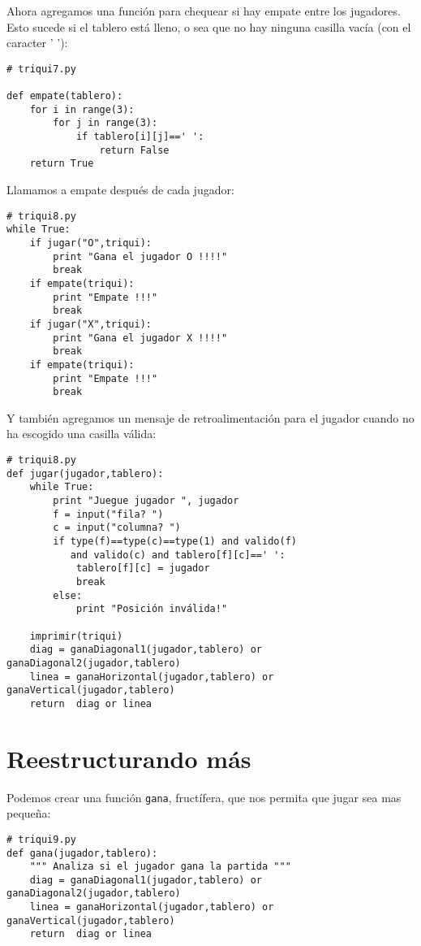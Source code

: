 Ahora agregamos una función para chequear si hay empate entre los jugadores.
Esto sucede si el tablero está lleno, o sea que no hay ninguna casilla vacía 
(con el caracter ' '):

\beforeverb
\begin{verbatim}
# triqui7.py

def empate(tablero):
    for i in range(3):
        for j in range(3):
            if tablero[i][j]==' ':
                return False
    return True

\end{verbatim}
\afterverb

Llamamos a empate después de cada jugador:
\beforeverb
\begin{verbatim}
# triqui8.py
while True:
    if jugar("O",triqui):
        print "Gana el jugador O !!!!"
        break
    if empate(triqui):
        print "Empate !!!"
        break
    if jugar("X",triqui):
        print "Gana el jugador X !!!!"
        break
    if empate(triqui):
        print "Empate !!!"
        break
\end{verbatim}
\afterverb

Y también agregamos un mensaje de retroalimentación para el jugador cuando no 
ha escogido una casilla válida:

\beforeverb
\begin{verbatim}
# triqui8.py
def jugar(jugador,tablero):
    while True:     
        print "Juegue jugador ", jugador
        f = input("fila? ")
        c = input("columna? ")
        if type(f)==type(c)==type(1) and valido(f) 
           and valido(c) and tablero[f][c]==' ':
            tablero[f][c] = jugador
            break
        else:
            print "Posición inválida!"

    imprimir(triqui)
    diag = ganaDiagonal1(jugador,tablero) or ganaDiagonal2(jugador,tablero)
    linea = ganaHorizontal(jugador,tablero) or ganaVertical(jugador,tablero)
    return  diag or linea
\end{verbatim}
\afterverb

\section{Reestructurando más}

Podemos crear una función \texttt{gana}, fructífera, que nos permita que jugar sea
mas pequeña:

\begin{verbatim}
# triqui9.py
def gana(jugador,tablero):
    """ Analiza si el jugador gana la partida """
    diag = ganaDiagonal1(jugador,tablero) or ganaDiagonal2(jugador,tablero)
    linea = ganaHorizontal(jugador,tablero) or ganaVertical(jugador,tablero)
    return  diag or linea

\end{verbatim}
\afterverb

